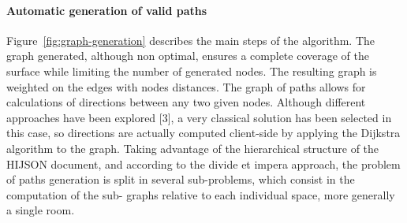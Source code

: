 \documentclass{sig-alternate}
\begin{document}
\paragraph{Automatic generation of valid paths}

Figure~\ref{fig:graph-generation} describes the main steps of the algorithm.
The graph generated, although non optimal, ensures a complete coverage of the
surface while limiting the number of generated nodes. The resulting graph is
weighted on the edges with nodes distances. 
The graph of paths allows for calculations of directions between any two given
nodes. Although different approaches have been explored [3], a very classical
solution has been selected in this case, so directions are actually computed
client-side by applying the Dijkstra algorithm to the graph.
Taking advantage of the hierarchical structure of the HIJSON document, and
according to the divide et impera approach, the problem of paths generation is
split in several sub-problems, which consist in the computation of the sub-
graphs relative to each individual space, more generally a single room.
\end{document}
